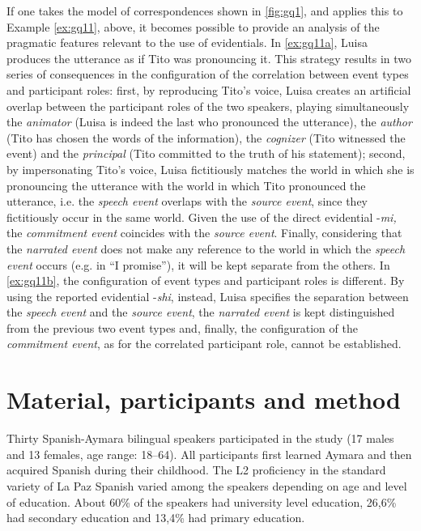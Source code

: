 \documentclass[output=paper]{langsci/langscibook}
\begin{document}
If one takes the model of correspondences shown in \ref{fig:gq1}, and applies this to Example \ref{ex:gq11}, above, it becomes possible to provide an analysis of the pragmatic features relevant to the use of evidentials. In \ref{ex:gq11a}, Luisa produces the utterance as if Tito was pronouncing it. This strategy results in two series of consequences in the configuration of the correlation between event types and participant roles: first, by reproducing Tito’s voice, Luisa creates an artificial overlap between the participant roles of the two speakers, playing simultaneously the \textit{animator} (Luisa is indeed the last who pronounced the utterance), the \textit{author} (Tito has chosen the words of the information), the \textit{cognizer} (Tito witnessed the event) and the \textit{principal} (Tito committed to the truth of his statement); second, by impersonating Tito’s voice, Luisa fictitiously matches the world in which she is pronouncing the utterance with the world in which Tito pronounced the utterance, i.e. the \textit{speech event} overlaps with the \textit{source event}, since they fictitiously occur in the same world. Given the use of the direct evidential -\textit{mi,} the \textit{commitment event} coincides with the \textit{source event}. Finally, considering that the \textit{narrated event} does not make any reference to the world in which the \textit{speech event} occurs (e.g. in “I promise”), it will be kept separate from the others. In \ref{ex:gq11b}, the configuration of event types and participant roles is different. By using the reported evidential -\textit{shi}, instead, Luisa specifies the separation between the \textit{speech event} and the \textit{source event}, the \textit{narrated event} is kept distinguished from the previous two event types and, finally, the configuration of the \textit{commitment event}, as for the correlated participant role, cannot be established. 

\section{Material, participants and method}\label{s:gq3}

Thirty Spanish-Aymara bilingual speakers participated in the study (17 males and 13 females, age range: 18--64). All participants first learned Aymara and then acquired Spanish during their childhood. The L2 proficiency in the standard variety of La Paz Spanish varied among the speakers depending on age and level of education. About 60\% of the speakers had university level education, 26,6\% had secondary education and 13,4\% had primary education. 
\end{document}
